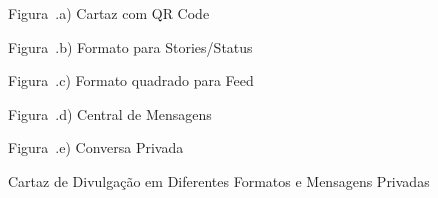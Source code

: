 \begin{figure}[H]
    \centering
    \caption{Cartaz de Divulgação em Diferentes Formatos e Mensagens Privadas}
    \label{fig:tela_cartaz_mensagens}
    \vspace{0.15cm}
    \begin{minipage}[t]{0.31\textwidth}
        \centering
        \par\vspace{0.12cm}
        {\small Figura~\thefigure.a) Cartaz com QR Code}
    \end{minipage}
    \hfill
    \begin{minipage}[t]{0.31\textwidth}
        \centering
        \par\vspace{0.12cm}
        {\small Figura~\thefigure.b) Formato para Stories/Status}
    \end{minipage}
    \hfill
    \begin{minipage}[t]{0.31\textwidth}
        \centering
        \par\vspace{0.12cm}
        {\small Figura~\thefigure.c) Formato quadrado para Feed}
    \end{minipage}
    \par\vspace{0.15cm}
    \begin{minipage}[t]{0.31\textwidth}
        \centering
        \par\vspace{0.12cm}
        {\small Figura~\thefigure.d) Central de Mensagens}
    \end{minipage}
    \hfill
    \begin{minipage}[t]{0.31\textwidth}
        \centering
        \par\vspace{0.12cm}
        {\small Figura~\thefigure.e) Conversa Privada}
    \end{minipage}
    \par\vspace{0.12cm}
\end{figure}

